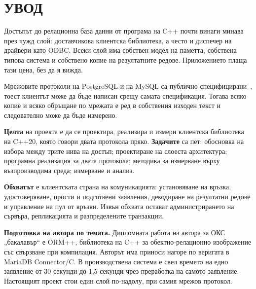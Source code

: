 \section*{УВОД}
\label{sec:introduction}

Достъпът до релационна база данни от програма на C++ почти винаги минава през чужд слой:
доставчикова клиентска библиотека, а често и диспечер на драйвери като ODBC. Всеки слой
има собствен модел на паметта, собствена типова система и собствено копие на резултатните
редове. Приложението плаща тази цена, без да я вижда.

Мрежовите протоколи на PostgreSQL и на MySQL са публично
специфицирани~\cite{pg_protocol, mysql_protocol}, тоест клиентът може да бъде написан
срещу самата спецификация. Тогава всяко копие и всяко обръщане по мрежата е ред в
собствения изходен текст и следователно може да бъде измерено.

\textbf{Целта} на проекта е да се проектира, реализира и измери клиентска библиотека на
C++20, която говори двата протокола пряко. \textbf{Задачите} са пет: обосновка на избора
между трите нива на достъп; проектиране на слоеста архитектура; програмна реализация за
двата протокола; методика за измерване върху възпроизводима среда; измерване и анализ.

\textbf{Обхватът} е клиентската страна на комуникацията: установяване на връзка,
удостоверяване, прости и подготвени заявления, декодиране на резултатни редове и
управление на пул от връзки. Извън обхвата остават администрирането на сървъра,
репликацията и разпределените транзакции.

\textbf{Подготовка на автора по темата.} Дипломната работа на автора за ОКС „бакалавър“
е ORM++, библиотека на C++ за обектно-релационно изображение със свързване при
компилация. Авторът има приноси нагоре по веригата в MariaDB Connector/C. В
производствена система е свел времето на едно заявление от 30 секунди до 1,5 секунди
чрез преработка на самото заявление. Настоящият проект стои един слой по-надолу, при
самия мрежов протокол.
